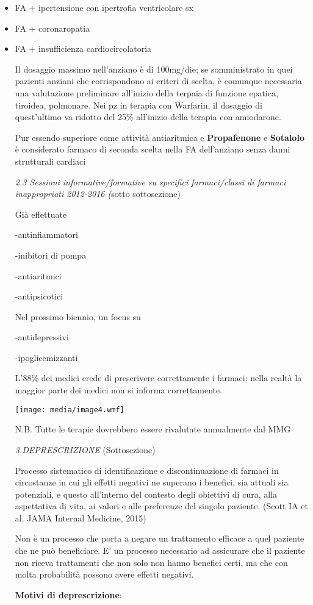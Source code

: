 \documentclass[]{article}
\begin{document}
\begin{itemize}
\item
  FA + ipertensione con ipertrofia ventricolare sx
\item
  FA + coronaropatia
\item
  FA + insufficienza cardiocircolatoria

  Il dosaggio massimo nell'anziano è di 100mg/die; se somministrato in
  quei pazienti anziani che corrispondono ai criteri di scelta, è
  comunque necessaria una valutazione preliminare all'inizio della
  terpaia di funzione epatica, tiroidea, polmonare. Nei pz in terapia
  con Warfarin, il dosaggio di quest'ultimo va ridotto del 25\%
  all'inizio della terapia con amiodarone.

  Pur essendo superiore come attività antiaritmica e
  \textbf{Propafenone} e \textbf{Sotalolo} è considerato farmaco di
  seconda scelta nella FA dell'anziano senza danni strutturali cardiaci

  \emph{2.3 Sessioni informative/formative su specifici farmaci/classi
  di farmaci inappropriati 2012-2016 (}sotto sottosezione)

  Già effettuate

  -antinfiammatori

  -inibitori di pompa

  -antiaritmici

  -antipsicotici

  Nel prossimo biennio, un focus su

  -antidepressivi

  -ipoglicemizzanti

  L'88\% dei medici crede di prescrivere correttamente i farmaci; nella
  realtà la maggior parte dei medici non si informa correttamente.

  \texttt{[image: media/image4.wmf]}

  N.B. Tutte le terapie dovrebbero essere rivalutate annualmente dal MMG

  \emph{3.DEPRESCRIZIONE} (Sottosezione)

  Processo sistematico di identificazione e discontinuazione di farmaci
  in circostanze in cui gli effetti negativi ne superano i benefici, sia
  attuali sia potenziali, e questo all'interno del contesto degli
  obiettivi di cura, alla aspettativa di vita, ai valori e alle
  preferenze del singolo paziente. (Scott IA et al. JAMA Internal
  Medicine, 2015)

  Non è un processo che porta a negare un trattamento efficace a quel
  paziente che ne può beneficiare. E' un processo necessario ad
  assicurare che il paziente non riceva trattamenti che non solo non
  hanno benefici certi, ma che con molta probabilità possono avere
  effetti negativi.

  \textbf{Motivi di deprescrizione}:
\end{itemize}
\end{document}
